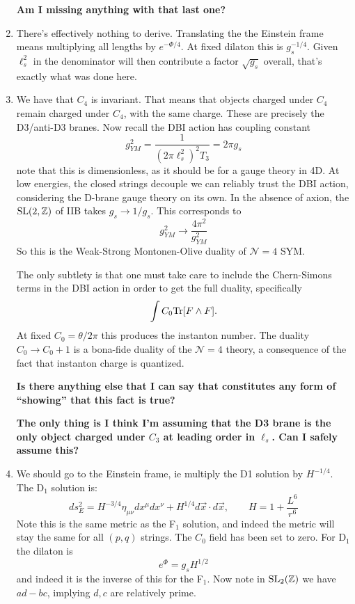 \documentclass[11pt, class=article, crop=false]{standalone}
\begin{document}
\begin{enumerate}
	\textbf{Am I missing anything with that last one?}
	
	\item There's effectively nothing to derive. Translating the the Einstein frame means multiplying all lengths by $e^{-\Phi/4}$. At fixed dilaton this is $g_s^{-1/4}$. Given $\ell_s^2$ in the denominator will then contribute a factor $\sqrt{g_s}$ overall, that's exactly what was done here.  
	
	\item We have that $C_4$ is invariant. That means that objects charged under $C_4$ remain charged under $C_4$, with the same charge. These are precisely the D3/anti-D3 branes. Now recall the DBI action has coupling constant
	\[
		g_{YM}^2 = \frac{1}{(2\pi \ell_s^2)^2 T_3} = 2 \pi g_s
	\]
	note that this is dimensionless, as it should be for a gauge theory in 4D. At low energies, the closed strings decouple we can reliably trust the DBI action, considering the D-brane gauge theory on its own. In the absence of axion, the $\mathrm{SL}(2, \mathbb{Z})$ of IIB takes $g_s \to 1/g_s$. This corresponds to
	\[
		g^2_{YM} \to \frac{4\pi^2}{g_{YM}^2}
	\]
	So this is the Weak-Strong Montonen-Olive duality of $\mathcal N=4$ SYM.
	
	The only subtlety is that one must take care to include the Chern-Simons terms in the DBI action in order to get the full duality, specifically 
	\[
		\int C_0 \mathrm{Tr} [F \wedge F].
	\]
	At fixed $C_0 = \theta/2\pi$ this produces the instanton number. The duality $C_0 \to C_0 + 1$ is a bona-fide duality of the $\mathcal N=4$ theory, a consequence of the fact that instanton charge is quantized. 
	
	\textbf{Is there anything else that I can say that constitutes any form of ``showing'' that this fact is true?}
	
	\textbf{The only thing is I think I'm assuming that the D3 brane is the only object charged under $C_3$ at leading order in $\ell_s$. Can I safely assume this?}
	
	\item We should go to the Einstein frame, ie multiply the D1 solution by $H^{-1/4}$. The D$_1$ solution is:
	\[
		ds^2_E = H^{-3/4} \eta_{\mu \nu} dx^\mu dx^\nu + H^{1/4} d \vec x \cdot d \vec x, \qquad H = 1 + \frac{L^6}{r^6}
	\]
	Note this is the same metric as the F$_1$ solution, and indeed the metric will stay the same for all $(p,q)$ strings. The $C_0$ field has been set to zero. For D$_1$ the dilaton is
	\[
		e^{\Phi} = g_s H^{1/2}
	\]
	and indeed it is the inverse of this for the F$_1$. Now note in $\mathrm{SL}_2(\mathbb{Z})$ we have $ad-bc$, implying $d,c$ are relatively prime. 
	

\end{enumerate}
\end{document}
